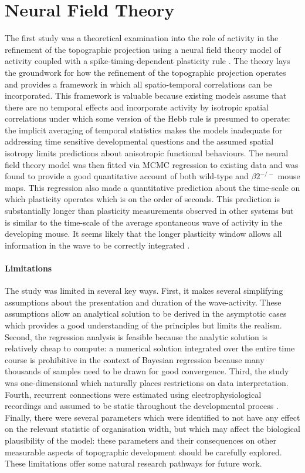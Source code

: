 \section{Neural Field Theory}
The first study was a theoretical examination into the role of activity in the refinement of the topographic projection using a neural field theory model of activity coupled with a spike-timing-dependent plasticity rule \cite{Robinson2011-ve}. The theory lays the groundwork for how the refinement of the topographic projection operates and provides a framework in which all spatio-temporal correlations can be incorporated. This framework is valuable because existing models assume that there are no temporal effects and incorporate activity by isotropic spatial correlations under which some version of the Hebb rule is presumed to operate: the implicit averaging of temporal statistics makes the models inadequate for addressing time sensitive developmental questions and the assumed spatial isotropy limits predictions about anisotropic functional behaviours. The neural field theory model was then fitted via MCMC regression to existing data and was found to provide a good quantitative account of both wild-type and $\beta2^{-/-}$ mouse maps. This regression also made a quantitative prediction about the time-scale on which plasticity operates which is on the order of seconds. This prediction is substantially longer than plasticity measurements observed in other systems but is similar to the time-scale of the average spontaneous wave of activity in the developing mouse. It seems likely that the longer plasticity window allows all information in the wave to be correctly integrated \cite{Xu2015-uc}.

\paragraph{Limitations} The study was limited in several key ways. First, it makes several simplifying assumptions about the presentation and duration of the wave-activity. These assumptions allow an analytical solution to be derived in the asymptotic cases which provides a good understanding of the principles but limits the realism. Second, the regression analysis is feasible because the analytic solution is relatively cheap to compute: a numerical solution integrated over the entire time course is prohibitive in the context of Bayesian regression because many thousands of samples need to be drawn for good convergence. Third, the study was one-dimensional which naturally places restrictions on data interpretation. Fourth, recurrent connections were estimated using electrophysiological recordings and assumed to be static throughout the developmental process \cite{Phongphanphanee2014-in}. Finally, there were several parameters which were identified to not have any effect on the relevant statistic of organisation width, but which may affect the biological plausibility of the model: these parameters and their consequences on other measurable aspects of topographic development should be carefully explored. These limitations offer some natural research pathways for future work.

